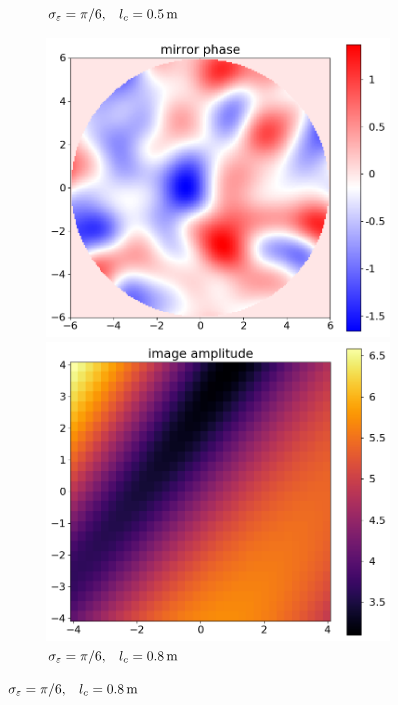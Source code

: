 \documentclass{article}
\newcommand{\eps}{\varepsilon}
\begin{document}
\begin{figure}
\begin{subfigure}{0.5\textwidth}
\begin{minipage}{0.5\textwidth}
        \end{minipage}
        \caption{$\sigma_{\eps} = \pi/6 \qq*{,} l_c = \SI{0.5}{m}$}\label{fig:corrpic:3}
    \end{subfigure}%
    \hfill
    \begin{subfigure}{0.5\textwidth}
        \begin{minipage}{0.5\textwidth}
            \centering
            \includegraphics[width=\textwidth]{pictures/error_pics/errors5in_phase.png}
        \end{minipage}%
        \begin{minipage}{0.5\textwidth}
            \centering
            \includegraphics[width=\textwidth]{pictures/error_pics/errors5out_abs.png}
        \end{minipage}
        \caption{$\sigma_{\eps} = \pi/6 \qq*{,} l_c = \SI{0.8}{m}$}\label{fig:corrpic:4}
    \end{subfigure}


\end{figure}
\end{document}
